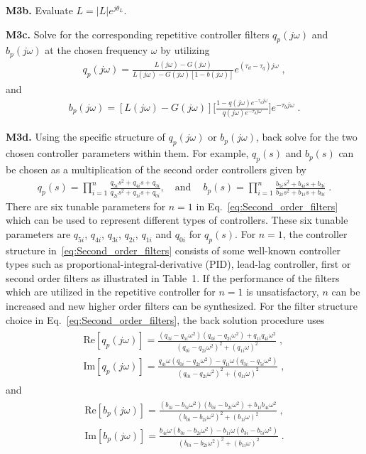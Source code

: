 \documentclass[12pt,draftcls,onecolumn]{IEEEtran}
\begin{document}
\textbf{M3b.} Evaluate $L = \vert L \vert e^{j\theta_{L}}$.

\textbf{M3c.} Solve for the corresponding repetitive controller filters $q_{p}(j\omega)$ and $b_{p}(j\omega)$ at the chosen frequency $\omega$ by utilizing
\begin{align}
	q_{p}(j\omega)=\frac{L(j\omega)-G(j\omega)}{L(j\omega)-G(j\omega)[1-b(j\omega)]}e^{(\tau_{d}-\tau_{q})j\omega} \;,
\end{align}
and
\begin{align}
	b_{p}(j\omega)=[L(j\omega)-G(j\omega)]\Big[\frac{1-q(j\omega)e^{-\tau_{d}j\omega}}{q(j\omega)e^{-\tau_{d}j\omega}}\Big]e^{-\tau_{b}j\omega} \;.
\end{align}

\textbf{M3d.} Using the specific structure of $q_{p}(j\omega)$ or $b_{p}(j\omega)$, back solve for the two chosen controller parameters within them. For example, $q_{p}(s)$ and $b_{p}(s)$ can be chosen as a multiplication of the second order controllers given by
\begin{align}
	q_{p}(s)=\prod_{i=1}^{n}\frac{q_{5i}s^{2}+q_{4i}s+q_{3i}}{q_{2i}s^{2}+q_{1i}s+q_{0i}}, \quad \text{and} \quad
~b_{p}(s)=\prod_{i=1}^{n}\frac{b_{5i}s^{2}+b_{4i}s+b_{3i}}{b_{2i}s^{2}+b_{1i}s+b_{0i}} \;. 
	\label{eq:Second_order_filters}
\end{align}
There are six tunable parameters for $n=1$ in Eq.~\eqref{eq:Second_order_filters} which can be used to represent different types of controllers. These six tunable parameters are $q_{5i}$, $q_{4i}$, $q_{3i}$, $q_{2i}$, $q_{1i}$ and $q_{0i}$ for $q_{p}(s)$. For $n=1$, the controller
structure in~\eqref{eq:Second_order_filters} consists of some well-known controller types such as proportional-integral-derivative (PID), lead-lag
controller, first or second order filters as illustrated in Table~1. If the performance of the filters which are utilized in the repetitive controller for $n=1$ is unsatisfactory, $n$ can be increased and new higher order filters can be synthesized. For the filter structure choice in Eq.~\eqref{eq:Second_order_filters}, the back solution procedure uses
\begin{align}
	\begin{array}{rcl}
		\mathrm{Re}[q_{p}(j\omega)]=\frac{(q_{3i}-q_{5i}\omega^{2})(q_{0i}-q_{2i}\omega^{2})+q_{1i}q_{4i}\omega^{2}}{(q_{0i}-q_{2i}\omega^{2})^{2}+(q_{1i}\omega)^{2}} \;, \\
		\mathrm{Im}[q_{p}(j\omega)]=\frac{q_{4i}\omega(q_{0i}-q_{2i}\omega^2)-q_{1i}\omega(q_{3i}-q_{5i}\omega^{2})}{(q_{0i}-q_{2i}\omega^{2})^{2}+(q_{1i}\omega)^{2}} \;,
	\end{array}
\end{align}
and
\begin{align}
	\begin{array}{rcl}
		\mathrm{Re}[b_{p}(j\omega)]=\frac{(b_{3i}-b_{5i}\omega^{2})(b_{0i}-b_{2i}\omega^{2})+b_{1i}b_{4i}\omega^{2}}{(b_{0i}-b_{2i}\omega^{2})^{2}+(b_{1i}\omega)^{2}} \;, \\
		\mathrm{Im}[b_{p}(j\omega)]=\frac{b_{4i}\omega(b_{0i}-b_{2i}\omega^2)-b_{1i}\omega(b_{3i}-b_{5i}\omega^{2})}{(b_{0i}-b_{2i}\omega^{2})^{2}+(b_{1i}\omega)^{2}} \;.
	\end{array}
\end{align}
\end{document}
